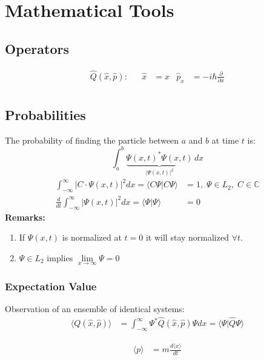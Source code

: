 \section{Mathematical Tools}

\subsection{Operators}
\noindent\begin{align*}
    \hat{Q}(\hat{x},\hat{p}): &  & \widehat{x} & =x & \widehat{p}_x & = -i\hbar \frac{\partial}{\partial x} \\
\end{align*}

\subsection{Probabilities}
The probability of finding the particle between $a$ and $b$ at time $t$ is:
\begin{equation*}
    \int_a^b \underbrace{{\Psi(x,t)}^*\Psi(x,t)}_{|\Psi(x,t)|^2}\,dx
\end{equation*}
\begin{align*}
    \int_{-\infty}^{\infty} |C\cdot \Psi(x,t)|^2 dx                                 = \langle C\Psi|C\Psi\rangle & = 1,\;\Psi\in L_2, \; C\in\mathbb{C} \\
    \frac{d}{dt}\int_{-\infty}^{\infty} |\Psi(x,t)|^2 dx = \langle\Psi|\Psi\rangle                               & = 0
\end{align*}
\textbf{Remarks:}
\begin{enumerate}
    \item If $\Psi(x,t)$ is normalized at $t=0$ it will stay normalized $\forall t$.
    \item $\Psi \in L_2$ implies $\lim \limits_{x \to \infty}\Psi=0$
\end{enumerate}

\subsubsection{Expectation Value}
Observation of an ensemble of identical systems:
\noindent\begin{align*}
    \langle Q(\hat{x},\hat{p})\rangle & = \int_{-\infty}^{\infty}\Psi^*\hat{Q}(\hat{x},\hat{p})\Psi dx = \langle\Psi|\widehat{Q}\Psi\rangle
\end{align*}

\noindent\begin{align*}
    \langle p \rangle & = m \frac{d\langle x \rangle}{dt}
\end{align*}

